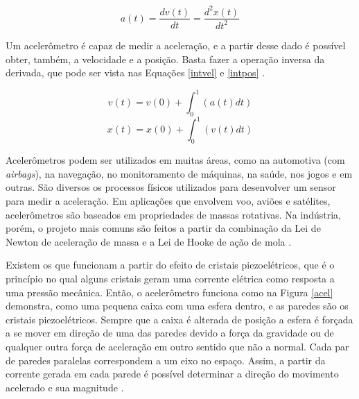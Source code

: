 				\begin{equation}
				a(t) = \frac{dv(t)}{dt} = \frac{d^2x(t)}{dt^2} 
				\label{equacel}
				\end{equation}
				
				Um acelerômetro é capaz de medir a aceleração, e a partir desse dado é possível obter, também, a velocidade e a posição. Basta fazer a operação inversa da derivada, que pode ser vista nas Equações \ref{intvel} e \ref{intpos} \cite{moyses2013}.
				
				\begin{equation}
				v(t) = v(0) + \int_{0}^{1}(a(t)dt)
				\label{intvel}
				\end{equation}
				\begin{equation}
				x(t) = x(0) + \int_{0}^{1}(v(t)dt)
				\label{intpos}
				\end{equation}
				
				Acelerômetros podem ser utilizados em muitas áreas, como na  automotiva (com \textit{airbags}), na navegação, no monitoramento de máquinas, na saúde, nos jogos e em outras. São diversos os processos físicos utilizados para desenvolver um sensor para medir a aceleração. Em aplicações que envolvem voo, aviões e satélites,
				acelerômetros são baseados em propriedades de massas rotativas. Na indústria,
				porém, o projeto mais comuns são feitos a partir da combinação da Lei de Newton de
				aceleração de massa e a Lei de Hooke de ação de mola \cite{carneiro2003}.
				
				Existem os que funcionam a partir do efeito de cristais piezoelétricos, que é o princípio no qual alguns cristais geram uma corrente elétrica como resposta a uma pressão mecânica. Então, o acelerômetro  funciona como na Figura \ref{acel} demonstra, como uma pequena caixa com uma esfera dentro, e as paredes são os cristais piezoelétricos.  Sempre que a caixa é alterada de posição a esfera é forçada a se mover em direção de uma das paredes devido a força da gravidade ou de qualquer outra força de aceleração em outro sentido que não a normal. Cada par de paredes paralelas correspondem a um eixo no espaço. Assim, a partir da corrente gerada em cada parede é possível determinar a direção do movimento acelerado e sua magnitude \cite{Sanjeev2018}.
				
